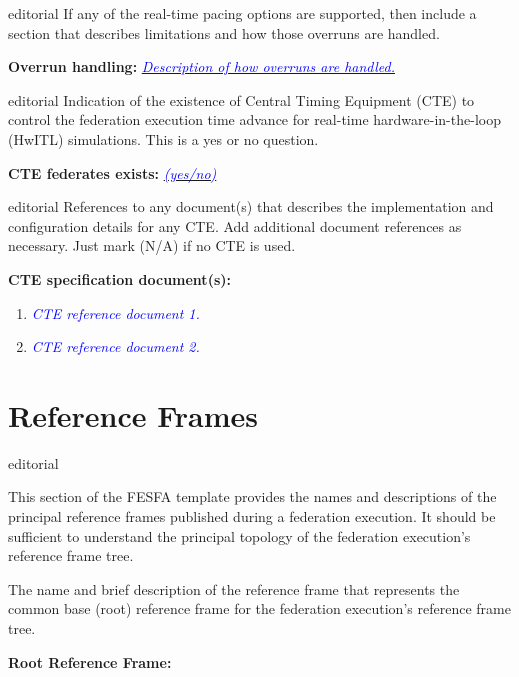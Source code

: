\documentclass[11pt,english,letterpaper]{article}
\newcommand{\example}[1]{{\textcolor{blue}{\textit{#1}}}}
\begin{document}
\begin{shownto}{editorial}
{\color{red} If any of the real-time pacing options are supported, then include
a section that describes limitations and how those overruns are handled.}
\end{shownto}

\textbf{Overrun handling: } \underline{\example{Description of how overruns
are handled.}}

\begin{shownto}{editorial}
{\color{red} Indication of the existence of Central Timing Equipment (CTE) to
control the federation execution time advance for real-time hardware-in-the-loop
(HwITL) simulations. This is a yes or no question.}
\end{shownto}

\textbf{CTE federates exists: } \underline{\example{(yes/no)}}

\begin{shownto}{editorial}
{\color{red} References to any document(s) that describes the implementation
and configuration details for any CTE. Add additional document references as
necessary. Just mark (N/A) if no CTE is used.}
\end{shownto}

\textbf{CTE specification document(s): }
\begin{enumerate}
\item \example{CTE reference document 1.}
\item \example{CTE reference document 2.}
\end{enumerate}


\section*{Reference Frames}

\begin{shownto}{editorial}
{\color{red} This section of the FESFA template provides the names and
descriptions of the principal reference frames published during a federation
execution. It should be sufficient to understand the principal topology of the
federation execution's reference frame tree.

The name and brief description of the reference frame that represents the
common base (root) reference frame for the federation execution's reference
frame tree.}
\end{shownto}

\textbf{Root Reference Frame: }
\end{document}
